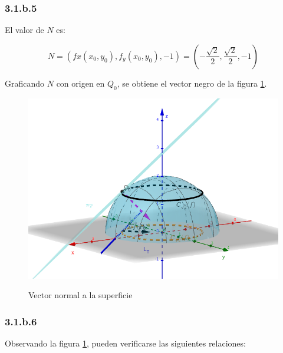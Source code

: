 \documentclass{article}
\begin{document}
\subsubsection*{3.1.b.5}
\label{subsubsec:3.1.b.5}

El valor de $N$ es:

\begin{equation}
N = (fx(x_0,y_0), f_y(x_0,y_0), -1) = \left( -\frac{\sqrt{2}}{2}, \frac{\sqrt{2}}{2}, -1 \right)
\end{equation}

Graficando $N$ con origen en $Q_0$, se obtiene el vector negro de la figura \ref{fig:1-b-5}.

\begin{figure}[ht]
\caption{Vector normal a la superficie}
\includegraphics[scale=0.35]{img/ejercicios/3/1-b-5.png} 
\centering
\label{fig:1-b-5}
\end{figure}

\subsubsection*{3.1.b.6}
\label{subsubsec:3.1.b.6}

Observando la figura \ref{fig:1-b-5}, pueden verificarse las siguientes relaciones:
\end{document}
